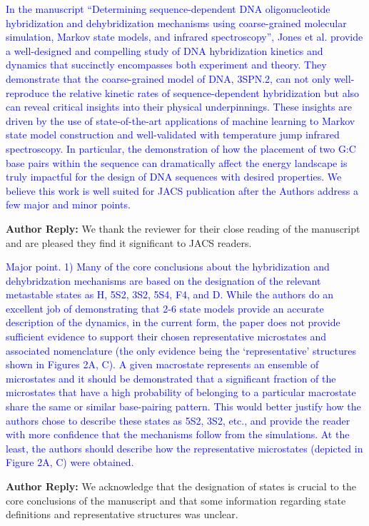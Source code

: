 \documentclass[11pt,a4paper]{letter} %
\begin{document}
\textcolor{blue}{In the manuscript “Determining sequence-dependent DNA oligonucleotide hybridization and dehybridization mechanisms using coarse-grained molecular simulation, Markov state models, and infrared spectroscopy”, Jones et al. provide a well-designed and compelling study of DNA hybridization kinetics and dynamics that succinctly encompasses both experiment and theory. They demonstrate that the coarse-grained model of DNA, 3SPN.2, can not only well-reproduce the relative kinetic rates of sequence-dependent hybridization but also can reveal critical insights into their physical underpinnings. These insights are driven by the use of state-of-the-art applications of machine learning to Markov state model construction and well-validated with temperature jump infrared spectroscopy. In particular, the demonstration of how the placement of two G:C base pairs within the sequence can dramatically affect the energy landscape is truly impactful for the design of DNA sequences with desired properties. We believe this work is well suited for JACS publication after the Authors address a few major and minor points.}

\textbf{Author Reply:}   We thank the reviewer for their close reading of the manuscript and are pleased they find it significant to JACS readers.

\textcolor{blue}{Major point.
1)      Many of the core conclusions about the hybridization and dehybridzation mechanisms are based on the designation of the relevant metastable states as H, 5S2, 3S2, 5S4, F4, and D. While the authors do an excellent job of demonstrating that 2-6 state models provide an accurate description of the dynamics, in the current form, the paper does not provide sufficient evidence to support their chosen representative microstates and associated nomenclature (the only evidence being the ‘representative’ structures shown in Figures 2A, C). A given macrostate represents an ensemble of microstates and it should be demonstrated that a significant fraction of the microstates that have a high probability of belonging to a particular macrostate share the same or similar base-pairing pattern. This would better justify how the authors chose to describe these states as 5S2, 3S2, etc., and provide the reader with more confidence that the mechanisms follow from the simulations. At the least, the authors should describe how the representative microstates (depicted in Figure 2A, C) were obtained.
}

\textbf{Author Reply:}   We acknowledge that the designation of states is crucial to the core conclusions of the manuscript and that some information regarding state definitions and representative structures was unclear.
\end{document}
